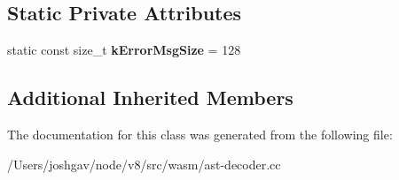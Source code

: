 \subsection*{Static Private Attributes}
\begin{DoxyCompactItemize}
\item 
static const size\+\_\+t {\bfseries k\+Error\+Msg\+Size} = 128\hypertarget{classv8_1_1internal_1_1wasm_1_1_s_r___wasm_decoder_a942bc22de3900a7afd183b1b9e764766}{}\label{classv8_1_1internal_1_1wasm_1_1_s_r___wasm_decoder_a942bc22de3900a7afd183b1b9e764766}

\end{DoxyCompactItemize}
\subsection*{Additional Inherited Members}


The documentation for this class was generated from the following file\+:\begin{DoxyCompactItemize}
\item 
/\+Users/joshgav/node/v8/src/wasm/ast-\/decoder.\+cc\end{DoxyCompactItemize}
